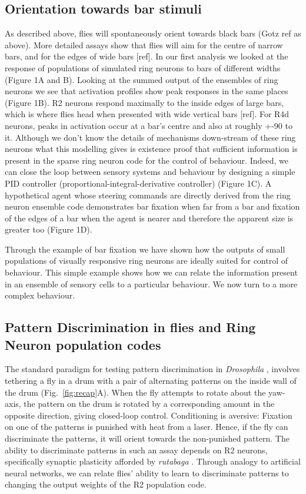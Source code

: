 \subsection*{Orientation towards bar stimuli}
As described above, flies will spontaneously orient towards black bars (Gotz ref as above). More detailed assays show that flies will aim for the centre of narrow bars, and for the edges of wide bars [ref]. In our first analysis we looked at the response of populations of simulated ring neurons to bars of different widths (Figure 1A and B). Looking at the summed output of the ensembles of ring neurons we see that activation profiles show peak responses in the same places (Figure 1B). R2 neurons respond maximally to the inside edges of large bars, which is where flies head when presented with wide vertical bars [ref]. For R4d neurons, peaks in activation occur at a bar's centre and also at roughly +-90 to it. Although we don't know the details of mechanisms down-stream of these ring neurons what this modelling gives is existence proof that sufficient information is present in the sparse ring neuron code for the control of behaviour. Indeed, we can close the loop between sensory systems and behaviour by designing a simple PID controller (proportional-integral-derivative controller) (Figure 1C). A hypothetical agent whose steering commands are directly derived from the ring neuron ensemble code demonstrates bar fixation when far from a bar and fixation of the edges of a bar when the agent is nearer and therefore the apparent size is greater too (Figure 1D).

Through the example of bar fixation we have shown how the outputs of small populations of visually responsive ring neurons are ideally suited for control of behaviour. This simple example shows how we can relate the information present in an ensemble of sensory cells to a particular behaviour. We now turn to a more complex behaviour.

\subsection*{Pattern Discrimination in flies and Ring Neuron population codes}
\label{sec:results:pattern}

The standard paradigm for testing pattern discrimination in \emph{Drosophila} \cite{Pan2009,Liu2006,Ernst1999,Dill1993}, involves tethering a fly in a drum with a pair of alternating patterns on the inside wall of the drum (Fig.~\ref{fig:recap}A).
When the fly attempts to rotate about the yaw-axis, the pattern on the drum is rotated by a corresponding amount in the opposite direction, giving closed-loop control.
Conditioning is aversive: Fixation on one of the patterns is punished with heat from a laser.
Hence, if the fly can discriminate the patterns, it will orient towards the non-punished pattern. The ability to discriminate patterns in such an assay depends on R2 neurons, specifically synaptic plasticity afforded by \emph{rutabaga} \cite{Pan2009,Wang2008,Liu2006,Ernst1999}. Through analogy to artificial neural networks, we can relate flies' ability to learn to discriminate patterns to changing the output weights of the R2 population code. 

